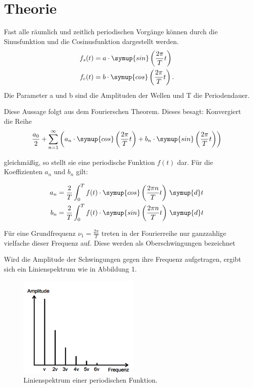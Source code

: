 \section{Theorie}
\label{sec:Theorie}

Fast alle räumlich und zeitlich periodischen Vorgänge können durch die Sinusfunktion
und die Cosinusfunktion dargestellt werden.
\begin{align}
  f_s(t) &= a \cdot \symup{sin}\left(\frac{2\pi}{T}t\right) \\
  f_c(t) &= b \cdot \symup{cos}\left(\frac{2\pi}{T}t\right).
\end{align}
Die Parameter a und b sind die Amplituden der Wellen und T die Periodendauer.

Diese Aussage folgt aus dem Fourierschen Theorem. Dieses besagt: Konvergiert die Reihe
\begin{equation}
  \frac{a_0}{2} + \sum_{n=1}^\infty \left(a_n \cdot \symup{cos}\left(\frac{2\pi}{T}t\right) + b_n \cdot \symup{sin}\left(\frac{2\pi}{T}t\right) \right)
\end{equation}

gleichmäßig, so stellt sie eine periodische Funktion $f(t)$ dar. Für die Koeffizienten $a_n$ und $b_n$ gilt:

\begin{align}
  a_n &= \frac{2}{T} \int_{0}^{T} f(t) \cdot \symup{cos}\left(\frac{2\pi n}{T}t\right) \, \symup{d}t \\
  b_n &= \frac{2}{T} \int_{0}^{T} f(t) \cdot \symup{sin}\left(\frac{2\pi n}{T}t\right) \, \symup{d}t
\end{align}

Für eine Grundfrequenz $\nu_1 = \frac{2\pi}{T}$ treten in der Fourierreihe nur ganzzahlige vielfache dieser
Frequenz auf. Diese werden als Oberschwingungen bezeichnet

Wird die Amplitude der Schwingungen gegen ihre Frequenz aufgetragen, ergibt sich ein
Linienspektrum wie in Abbildung 1.

\begin{figure}[H]
  \centering
  \includegraphics[height=5cm]{Linienspektrum.PNG}
  \caption{Linienspektrum einer periodischen Funktion. \cite{sample}}
  \label{fig:Linienspektrum}
\end{figure}

